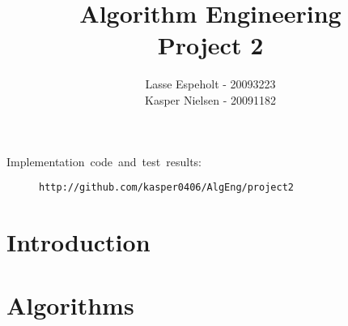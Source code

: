\documentclass[a4paper]{article}
\begin{document}
\title{Algorithm Engineering\\Project 2}

\author{Lasse Espeholt - 20093223\\
Kasper Nielsen - 20091182}

\maketitle
\vfill{}
\begin{description}
\item [{Implementation~code~and~test~results:}] \texttt{http://github.com/kasper0406/AlgEng/project2}
\end{description}
\pagebreak{}\tableofcontents{}\pagebreak{}

\section{Introduction}


\section{Algorithms}

\end{document}

